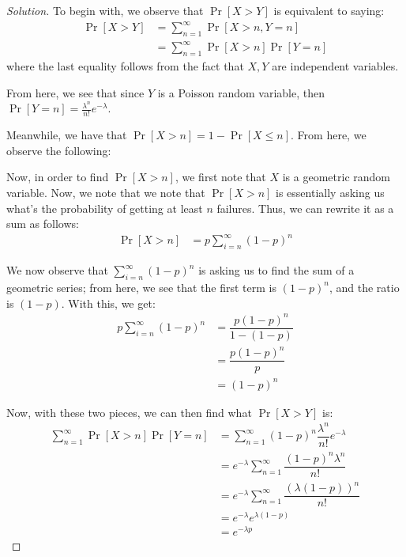 \documentclass{article}
\newenvironment{solution}{\begin{proof}[Solution]}{\end{proof}}
\let\oldsum\sum
\renewcommand{\sum}[2]{\oldsum\limits_{#1}^{#2}}
\begin{document}
\begin{solution}
	To begin with, we observe that $\Pr[X>Y]$ is equivalent to saying:
	\begin{align*}
		\Pr[X>Y] &= \sum{n=1}{\infty} \Pr[X > n, Y = n] \\
		&=\sum{n=1}{\infty}\Pr[X > n]\Pr[Y = n]
	\end{align*} where the last equality follows from the fact that $X,Y$ are independent variables. 
	
	From here, we see that since $Y$ is a Poisson random variable, then $\Pr[Y=n] = \frac{\lambda^{n}}{n!}e^{-\lambda}$.
	
	Meanwhile, we have that $\Pr[X > n] = 1 - \Pr[X \leq n]$. From here, we observe the following:
	
	
	Now, in order to find $\Pr[X > n]$, we first note that $X$ is a geometric random variable. Now, we note that we note that $\Pr[X > n]$ is essentially asking us what's the probability of getting at least $n$ failures. Thus, we can rewrite it as a sum as follows:
	\begin{align*}
		\Pr[X > n] &= p \sum{i=n}{\infty} (1-p)^{n}
	\end{align*}

	We now observe that $\sum{i=n}{\infty} (1-p)^{n}$ is asking us to find the sum of a geometric series; from here, we see that the first term is $(1-p)^{n}$, and the ratio is $(1-p)$. With this, we get:
	\begin{align*}
		p \sum{i=n}{\infty} (1-p)^{n} &= \dfrac{p(1-p)^{n}}{1-(1-p)} \\
		&= \dfrac{p(1-p)^{n}}{p} \\
		&= (1-p)^{n}
	\end{align*}

	Now, with these two pieces, we can then find what $\Pr[X > Y]$ is:
	\begin{align*}
		\sum{n=1}{\infty} \Pr[X > n] \Pr[Y = n] &= \sum{n=1}{\infty} (1-p)^{n} \dfrac{\lambda^{n}}{n!} e^{-\lambda} \\
		&= e^{-\lambda} \sum{n=1}{\infty} \dfrac{(1-p)^{n}\lambda^{n}}{n!} \\
		&= e^{-\lambda} \sum{n=1}{\infty} \dfrac{(\lambda(1-p))^{n}}{n!} \\
		&= e^{-\lambda}e^{\lambda(1-p)} \tag*{by Taylor Series definition of $e$} \\
		&= e^{-\lambda p}
	\end{align*}
\end{solution}

\newpage
\end{document}
